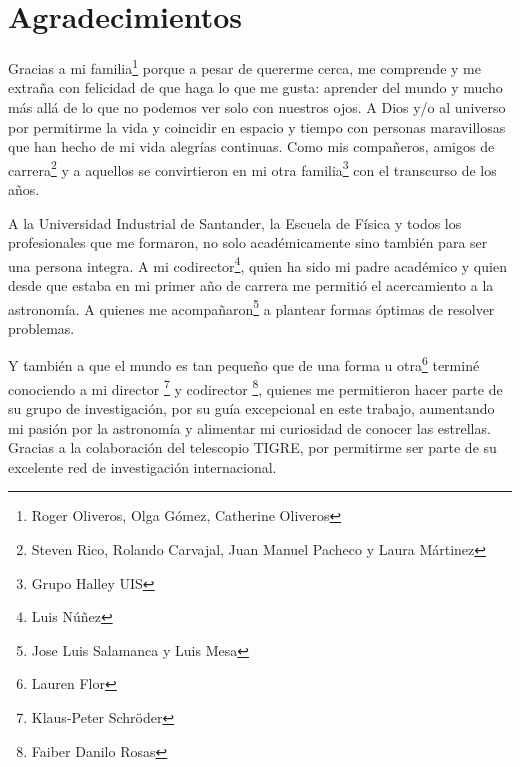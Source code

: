 \documentclass[12pt,oneside,openany,letter]{book}
\begin{document}
\chapter*{Agradecimientos}


\noindent Gracias a mi familia\footnote{Roger Oliveros, Olga Gómez, Catherine Oliveros} porque a pesar de quererme cerca, me comprende y me extraña con felicidad de que haga lo que me gusta: aprender del mundo y mucho más allá de lo que no podemos ver solo con nuestros ojos. A Dios y/o al universo  por permitirme la vida y coincidir en espacio y tiempo con personas maravillosas que han hecho de mi vida alegrías continuas. Como mis compañeros, amigos de carrera\footnote{Steven Rico, Rolando Carvajal, Juan Manuel Pacheco y Laura Mártinez} y a aquellos se convirtieron en mi otra familia\footnote{Grupo Halley UIS} con el transcurso de los años. 

\noindent A la Universidad Industrial de Santander, la Escuela de Física y todos los profesionales que me formaron, no solo académicamente sino también para ser una persona integra. A mi codirector\footnote{Luis Núñez}, quien ha sido mi padre académico y quien desde que estaba en mi primer año de carrera me permitió el acercamiento a la astronomía. A quienes me acompañaron\footnote{Jose Luis Salamanca y Luis Mesa} a plantear formas óptimas de resolver problemas. 


\noindent Y también a que el mundo es tan pequeño que de una forma u otra\footnote{Lauren Flor} terminé conociendo a mi director \footnote{Klaus-Peter Schröder} y codirector \footnote{Faiber Danilo Rosas}, quienes me permitieron hacer parte de su grupo de investigación, por su guía excepcional en este trabajo, aumentando mi pasión por la astronomía y alimentar mi curiosidad de conocer las estrellas. Gracias a la colaboración del telescopio TIGRE, por permitirme ser parte de su excelente red de investigación internacional.




\tableofcontents
\listoffigures
\listoftables
\end{document}
